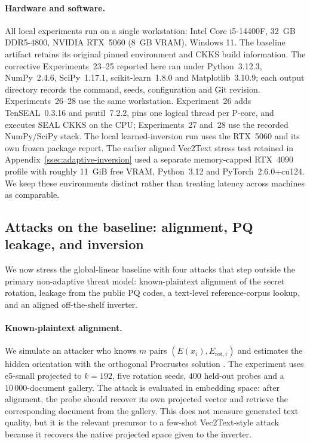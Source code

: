 \documentclass[11pt,a4paper]{article}
\begin{document}
\paragraph{Hardware and software.} All local experiments run on a single
workstation: Intel Core i5-14400F, 32~GB DDR5-4800, NVIDIA RTX~5060
(8~GB VRAM), Windows 11. The baseline artifact retains its original pinned
environment and CKKS build information. The corrective Experiments~23--25
reported here ran under Python~3.12.3, NumPy~2.4.6, SciPy~1.17.1,
scikit-learn~1.8.0 and Matplotlib~3.10.9; each output directory records the
command, seeds, configuration and Git revision. Experiments~26--28 use the
same workstation. Experiment~26 adds TenSEAL~0.3.16 and psutil~7.2.2, pins one
logical thread per P-core, and executes SEAL CKKS on the CPU; Experiments~27
and~28 use the recorded NumPy/SciPy stack. The local learned-inversion run
uses the RTX~5060 and its own frozen package report. The earlier aligned
Vec2Text stress test retained in Appendix~\ref{ssec:adaptive-inversion} used
a separate memory-capped RTX~4090 profile with roughly 11~GiB free VRAM,
Python~3.12 and PyTorch~2.6.0+cu124. We keep these environments distinct
rather than treating latency across machines as comparable.

\subsection{Attacks on the baseline: alignment, PQ leakage, and inversion}\label{ssec:alignment-pq}

We now stress the global-linear baseline with four attacks that step outside
the primary non-adaptive threat model: known-plaintext alignment of the
secret rotation, leakage from the public PQ codes, a text-level
reference-corpus lookup, and an aligned off-the-shelf inverter.

\paragraph{Known-plaintext alignment.} We simulate an attacker who knows
$m$ pairs $(E(x_i), E_{\mathrm{rot},i})$ and estimates the hidden
orientation with the orthogonal Procrustes solution
\cite{ref_schonemann}. The experiment uses e5-small projected to
$k=192$, five rotation seeds, $400$ held-out probes and a
$10\,000$-document gallery. The attack is evaluated in embedding space:
after alignment, the probe should recover its own projected vector and
retrieve the corresponding document from the gallery. This does not
measure generated text quality, but it is the relevant precursor to a
few-shot Vec2Text-style attack because it recovers the native projected
space given to the inverter.
\end{document}
